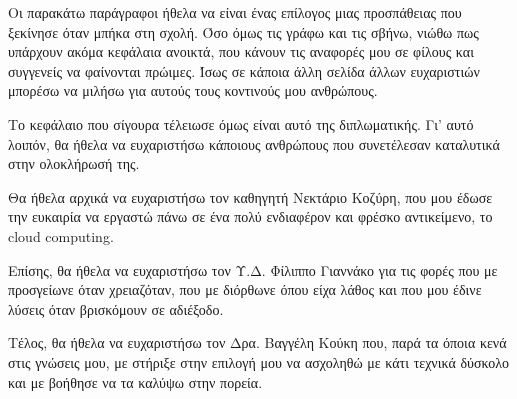 \begin{acknowledgementsgr}
	Οι παρακάτω παράγραφοι ήθελα να είναι ένας επίλογος μιας προσπάθειας 
	που ξεκίνησε όταν μπήκα στη σχολή. Όσο όμως τις γράφω και τις σβήνω, 
	νιώθω πως υπάρχουν ακόμα κεφάλαια ανοικτά, που κάνουν τις αναφορές μου 
	σε φίλους και συγγενείς να φαίνονται πρώιμες. Ίσως σε κάποια άλλη 
	σελίδα άλλων ευχαριστιών μπορέσω να μιλήσω για αυτούς τους κοντινούς 
	μου ανθρώπους.

	Το κεφάλαιο που σίγουρα τέλειωσε όμως είναι αυτό της διπλωματικής. Γι' 
	αυτό λοιπόν, θα ήθελα να ευχαριστήσω κάποιους ανθρώπους που συνετέλεσαν 
	καταλυτικά στην ολοκλήρωσή της.
	
	Θα ήθελα αρχικά να ευχαριστήσω τον καθηγητή Νεκτάριο Κοζύρη, που μου 
	έδωσε την ευκαιρία να εργαστώ πάνω σε ένα πολύ ενδιαφέρον και φρέσκο 
	αντικείμενο, το cloud computing.

	Επίσης, θα ήθελα να ευχαριστήσω τον Υ.Δ. Φίλιππο Γιαννάκο για τις φορές 
	που με προσγείωνε όταν χρειαζόταν, που με διόρθωνε όπου είχα λάθος και 
	που μου	έδινε λύσεις όταν βρισκόμουν σε αδιέξοδο.

	Τέλος, θα ήθελα να ευχαριστήσω τον Δρα. Βαγγέλη Κούκη που, παρά τα 
	όποια κενά στις γνώσεις μου, με στήριξε στην επιλογή μου να ασχοληθώ με 
	κάτι τεχνικά δύσκολο και με βοήθησε να τα καλύψω στην πορεία.
\end{acknowledgementsgr}
